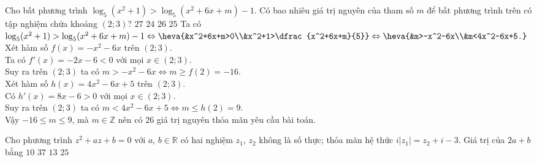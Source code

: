 \begin{ex}%
Cho bất phương trình $\log_5(x^2+1)>\log_5(x^2+6x+m)-1$. Có bao nhiêu giá trị nguyên của tham số $m$ để bất phương trình trên có tập nghiệm chứa khoảng $(2;3)$?
		\choice
		{$27$}
		{$24$}
		{\True $26$}
		{$25$}
	\loigiai
	{
Ta có $\log_5(x^2+1)>\log_5(x^2+6x+m)-1\Leftrightarrow \heva{&x^2+6x+m>0\\&x^2+1>\dfrac{x^2+6x+m}{5}}\Leftrightarrow\heva{&m>-x^2-6x\\&m<4x^2-6x+5.}$\\
Xét hàm số $f(x)=-x^2-6x$ trên $(2;3)$.\\
Ta có $f'(x)=-2x-6<0$ với mọi $x\in (2;3)$.\\
Suy ra trên $(2;3)$ ta có $m>-x^2-6x\Leftrightarrow m\ge f(2)=-16$.\\
Xét hàm số $h(x)=4x^2-6x+5$ trên $(2;3)$.\\
Có $h'(x)=8x-6>0$ với mọi $x\in (2;3)$.\\
Suy ra trên $(2;3)$ ta có $m<4x^2-6x+5\Leftrightarrow m\le h(2)=9$.\\
Vậy $-16\le m\le 9$, mà $m\in \mathbb{Z}$ nên có $26$ giá trị nguyên thỏa mãn yêu cầu bài toán.
}
\end{ex}
\begin{ex}%
Cho phương trình $z^2+az+b=0$ với $a$, $b\in\mathbb{R}$ có hai nghiệm $z_1$, $z_2$ không là số thực; thỏa mãn hệ thức $i|z_1|=z_2+i-3$. Giá trị của $2a+b$ bằng
		\choice
		{$10$}
		{$37$}
		{\True $13$}
		{$25$}
\end{ex}

